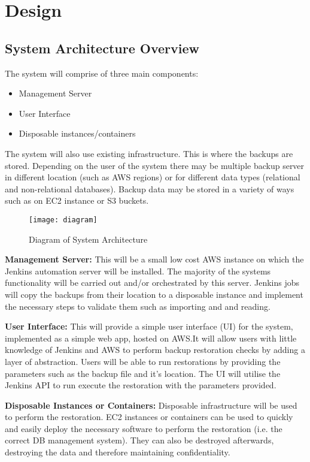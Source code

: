 \section{Design}
	\subsection{System Architecture Overview}
		The system will comprise of three main components:
		\begin{itemize}
			\item Management Server
			\item User Interface
			\item Disposable instances/containers
		\end{itemize}
		The system will also use existing infrastructure. This is where the backups are stored. Depending on the user of the system there may be multiple backup server in different location (such as AWS regions) or for different data types (relational and non-relational databases). Backup data may be stored in a variety of ways such as on EC2 instance or S3 buckets.
		
		\begin{figure}[H]
			\setlength{\belowcaptionskip}{15pt plus 3pt minus 2pt}
			\caption{Diagram of System Architecture}
			\centering
			\texttt{[image: diagram]}
			\label{fig:diagram}
		\end{figure}
		
		\noindent \textbf{Management Server:} This will be a small low cost AWS instance on which the Jenkins automation server will be installed. The majority of the systems functionality will be carried out and/or orchestrated by this server. Jenkins jobs will copy the backups from their location to a disposable instance and implement the necessary steps to validate them such as importing and and reading.
		
		\noindent \textbf{User Interface:} This will provide a simple user interface (UI) for the system, implemented as a simple web app, hosted on AWS.It will allow users with little knowledge of Jenkins and AWS to perform backup restoration checks by adding a layer of abstraction. Users will be able to run restorations by providing the parameters such as the backup file and it's location. The UI will utilise the Jenkins API to run execute the restoration with the parameters provided.
		
		\noindent\textbf{Disposable Instances or Containers:} Disposable infrastructure will be used to perform the restoration. EC2 instances or containers can be used to quickly and easily deploy the necessary software to perform the restoration (i.e. the correct DB management system). They can also be destroyed afterwards, destroying the data and therefore maintaining confidentiality.

